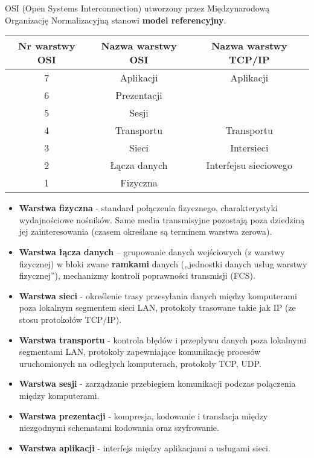 \documentclass[../main.tex]{subfiles}
\begin{document}
    OSI (Open Systems Interconnection) utworzony przez Międzynarodową Organizację
    Normalizacyjną stanowi \textbf{model referencyjny}.


    \begin{tabular}{|c|c|c| }
        \hline
        Nr warstwy OSI & Nazwa warstwy OSI & Nazwa warstwy TCP/IP\\
        \hline
        7 & Aplikacji & Aplikacji\\
        6 & Prezentacji &\\
        5 & Sesji & \\
        \hline
        4 & Transportu & Transportu \\
        \hline
        3 & Sieci & Intersieci \\
        \hline
        2 & Łącza danych & Interfejsu sieciowego\\

        1 & Fizyczna & \\
        \hline
    \end{tabular}

    \begin{itemize}
        \item \textbf{Warstwa fizyczna} - standard połączenia fizycznego, charakterystyki wydajnościowe nośników. Same media transmisyjne pozostają poza dziedziną jej
        zainteresowania (czasem określane są terminem warstwa zerowa).
        \item \textbf{Warstwa łącza danych} – grupowanie danych wejściowych (z warstwy fizycznej) w bloki zwane \textbf{ramkami} danych („jednostki
        danych usług warstwy fizycznej”), mechanizmy kontroli poprawności
        transmisji (FCS).
        \item \textbf{Warstwa sieci} - określenie trasy przesyłania
        danych między komputerami poza lokalnym segmentem sieci LAN, protokoły trasowane takie jak IP (ze stosu protokołów TCP/IP).
        \item \textbf{Warstwa transportu} - kontrola błędów i przepływu danych
        poza lokalnymi segmentami LAN, protokoły zapewniające
        komunikację procesów uruchomionych na odległych komputerach, protokoły TCP, UDP.
        \item \textbf{Warstwa sesji} - zarządzanie przebiegiem komunikacji podczas
        połączenia między komputerami.
        \item \textbf{Warstwa prezentacji} - kompresja, kodowanie i
        translacja między niezgodnymi schematami kodowania oraz szyfrowanie.
        \item \textbf{Warstwa aplikacji} - interfejs między aplikacjami a
        usługami sieci.
    \end{itemize}
\end{document}
